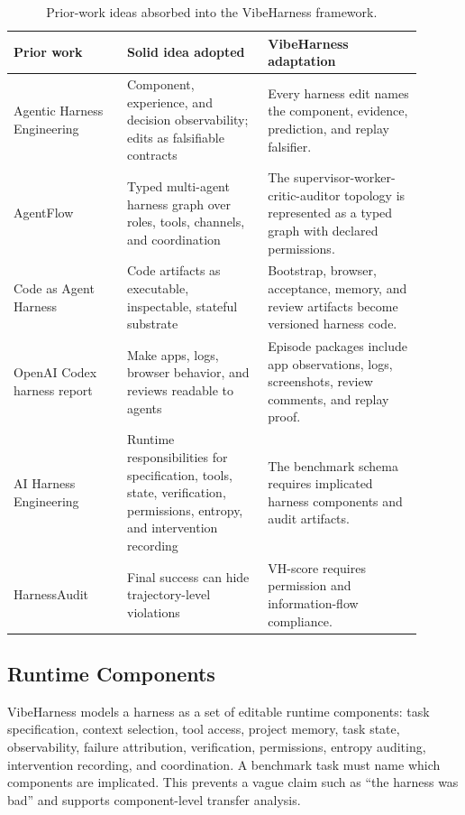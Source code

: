 \documentclass[11pt]{article}
\begin{document}
\begin{table}[ht]
\centering
\small
\begin{tabular}{>{\raggedright\arraybackslash}p{0.25\linewidth}>{\raggedright\arraybackslash}p{0.31\linewidth}>{\raggedright\arraybackslash}p{0.34\linewidth}}
\toprule
Prior work & Solid idea adopted & VibeHarness adaptation \\
\midrule
Agentic Harness Engineering & Component, experience, and decision
observability; edits as falsifiable contracts & Every harness edit names the
component, evidence, prediction, and replay falsifier. \\
AgentFlow & Typed multi-agent harness graph over roles, tools, channels, and
coordination & The supervisor-worker-critic-auditor topology is represented as
a typed graph with declared permissions. \\
Code as Agent Harness & Code artifacts as executable, inspectable, stateful
substrate & Bootstrap, browser, acceptance, memory, and review artifacts become
versioned harness code. \\
OpenAI Codex harness report & Make apps, logs, browser behavior, and reviews
readable to agents & Episode packages include app observations, logs,
screenshots, review comments, and replay proof. \\
AI Harness Engineering & Runtime responsibilities for specification, tools,
state, verification, permissions, entropy, and intervention recording & The
benchmark schema requires implicated harness components and audit artifacts. \\
HarnessAudit & Final success can hide trajectory-level violations & VH-score
requires permission and information-flow compliance. \\
\bottomrule
\end{tabular}
\caption{Prior-work ideas absorbed into the VibeHarness framework.}
\label{tab:adopted-principles}
\end{table}

\subsection{Runtime Components}

VibeHarness models a harness as a set of editable runtime components: task
specification, context selection, tool access, project memory, task state,
observability, failure attribution, verification, permissions, entropy auditing,
intervention recording, and coordination. A benchmark task must name which
components are implicated. This prevents a vague claim such as ``the harness was
bad'' and supports component-level transfer analysis.
\end{document}
